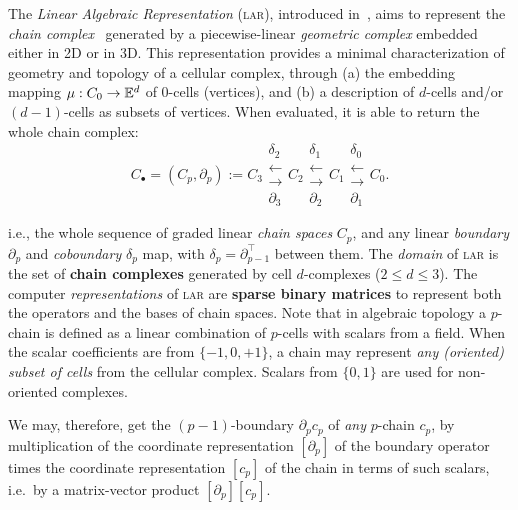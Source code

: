 The \emph{Linear Algebraic Representation} (\textsc{lar}), introduced in~\cite{Dicarlo:2014:TNL:2543138.2543294}, aims to represent the \emph{chain complex}~\cite{DiCarlo2009,TSAS} generated by a piecewise-linear \emph{geometric complex} embedded either in 2D or in 3D. This representation provides a minimal characterization of geometry and topology of a cellular complex, through (a) the embedding mapping $\mu : C_0 \to \mathbb{E}^d$ of 0-cells (vertices), and (b) a description of $d$-cells and/or $(d-1)$-cells as subsets of vertices. When evaluated, it is able to return the whole chain complex:
\begin{equation}
C_\bullet = (C_p, \partial_p) := 
C_3 
\substack{
\delta_2 \\
\longleftarrow \\
\longrightarrow \\
\partial_3 
}
C_2 
\substack{
\delta_1 \\
\longleftarrow \\
\longrightarrow \\
\partial_2 
}
C_1  
\substack{
\delta_0 \\
\longleftarrow  \\
\longrightarrow \\
\partial_1 
}
C_0 .
\end{equation}

\noindent
i.e., the whole sequence of graded linear \emph{chain spaces} $C_p$, and any linear \emph{boundary} $\partial_p$ and \emph{coboundary} $\delta_p$ map, with $\delta_p=\partial_{p-1}^\top$ between them.
 The \emph{domain} of \textsc{lar} is the set of \textbf{chain complexes} generated by cell $d$-complexes ($2\leq d\leq 3$). The computer \emph{representations} of \textsc{lar} are \textbf{sparse binary matrices} to represent both the operators and the bases of chain spaces. Note that in algebraic topology a $p$-chain is defined as a linear combination of $p$-cells with scalars from a field. When the scalar coefficients are from $\{-1, 0, +1\}$, a chain may represent \emph{any (oriented) subset of cells} from the cellular complex.
Scalars from $\{0, 1\}$ are used for non-oriented complexes.

We may, therefore, get the $(p-1)$-boundary $\partial_p c_p$ of \emph{any} $p$-chain $c_p$, by multiplication of the coordinate representation $[\partial_p]$ of the boundary operator times the coordinate representation $[c_p]$ of the chain in terms of such scalars, i.e.~by a  matrix-vector product $ [\partial_p] [c_p] $.

